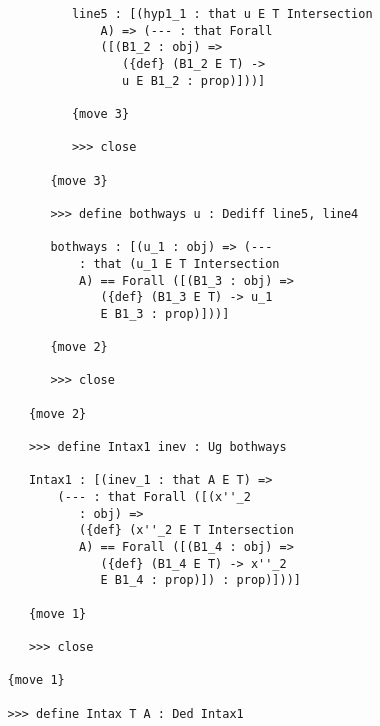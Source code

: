 \documentclass[12pt]{article}
\begin{document}
\begin{verbatim}
            line5 : [(hyp1_1 : that u E T Intersection 
                A) => (--- : that Forall 
                ([(B1_2 : obj) => 
                   ({def} (B1_2 E T) -> 
                   u E B1_2 : prop)]))]

            {move 3}

            >>> close

         {move 3}

         >>> define bothways u : Dediff line5, line4

         bothways : [(u_1 : obj) => (--- 
             : that (u_1 E T Intersection 
             A) == Forall ([(B1_3 : obj) => 
                ({def} (B1_3 E T) -> u_1 
                E B1_3 : prop)]))]

         {move 2}

         >>> close

      {move 2}

      >>> define Intax1 inev : Ug bothways

      Intax1 : [(inev_1 : that A E T) => 
          (--- : that Forall ([(x''_2 
             : obj) => 
             ({def} (x''_2 E T Intersection 
             A) == Forall ([(B1_4 : obj) => 
                ({def} (B1_4 E T) -> x''_2 
                E B1_4 : prop)]) : prop)]))]

      {move 1}

      >>> close

   {move 1}

   >>> define Intax T A : Ded Intax1


\end{verbatim}
\end{document}
